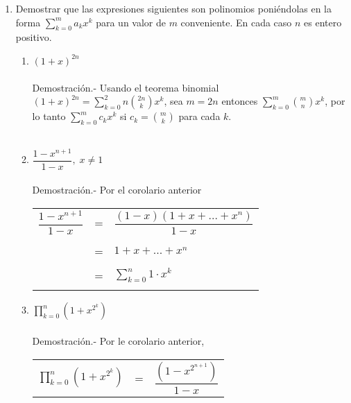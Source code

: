 \begin{enumerate}
        \item Demostrar que las expresiones siguientes son polinomios poniéndolas en la forma $\displaystyle\sum_{k=0}^m a_k x^k$ para un valor de $m$ conveniente. En cada caso $n$ es entero positivo.
            \begin{enumerate}[\bfseries (a)]
                \item $(1+x)^{2n}$\\\\
                Demostración.- \; Usando el teorema binomial $(1+x)^{2n} = \displaystyle\sum_{k=0}^2n {2n \choose k} x^k$, sea $m=2n$ entonces $\displaystyle\sum_{k=0}^m {m \choose n} x^k$, por lo tanto $\displaystyle\sum_{k=0}^m c_k x^k$ si $c_k = {m \choose k} $ para cada $k$.\\\\
                \item $\dfrac{1- x^{n+1}}{1-x}, \; x \neq 1$\\\\
                Demostración.- \; Por el corolario anterior 
                    \begin{center}
                        \begin{tabular}{r c l}
                            $\dfrac{1 - x^{n+1}}{1-x}$&=&$\dfrac{(1-x)(1+x+...+x^n)}{1-x}$\\\\
                            &=&$1 + x + ... + x^n$\\\\
                            &=&$\displaystyle\sum_{k=0}^n 1 \cdot x^k$\\\\
                        \end{tabular}
                    \end{center}
                \item $\displaystyle\prod_{k=0}^n (1+x^{2^k})$\\\\
                Demostración.- \; Por le corolario anterior,
                    \begin{center}
                        \begin{tabular}{r c l}
                            $\displaystyle\prod_{k=0}^n \left( 1+x^{2^k} \right)$&=&$\dfrac{(1 - x^{2^{n+1}})}{1-x}$\\

\end{tabular}
\end{center}
\end{enumerate}
\end{enumerate}
